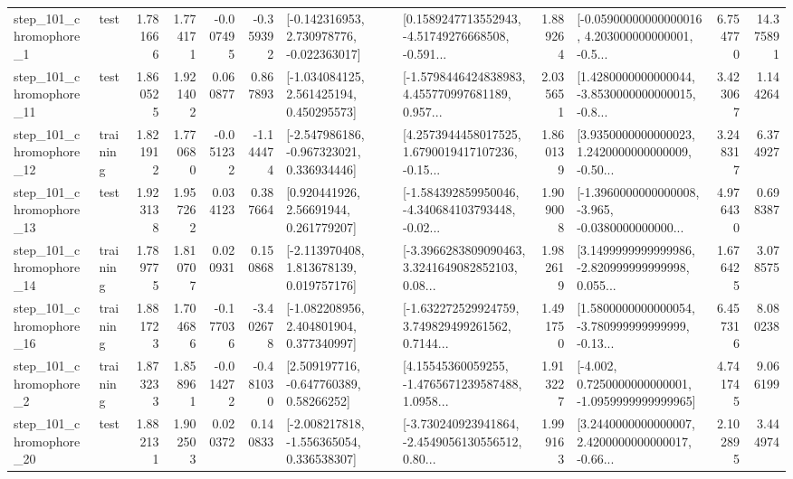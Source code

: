 \begin{tabular}{llrrrrllrlrr}
   step\_101\_chromophore\_1 &      test &      1.781666 &    1.774171 &     -0.007495 & -0.359392 &   [-0.142316953, 2.730978776, -0.022363017] &  [0.1589247713552943, -4.51749276668508, -0.591... &       1.889264 &  [-0.05900000000000016, 4.203000000000001, -0.5... &            6.754770 &         14.375891 \\
  step\_101\_chromophore\_11 &      test &      1.860525 &    1.921402 &      0.060877 &  0.867893 &    [-1.034084125, 2.561425194, 0.450295573] &  [-1.5798446424838983, 4.455770997681189, 0.957... &       2.035651 &  [1.4280000000000044, -3.8530000000000015, -0.8... &            3.423067 &          1.144264 \\
  step\_101\_chromophore\_12 &  training &      1.821912 &    1.770680 &     -0.051232 & -1.144474 &   [-2.547986186, -0.967323021, 0.336934446] &  [4.2573944458017525, 1.6790019417107236, -0.15... &       1.860139 &  [3.9350000000000023, 1.2420000000000009, -0.50... &            3.248317 &          6.374927 \\
  step\_101\_chromophore\_13 &      test &      1.923138 &    1.957262 &      0.034123 &  0.387664 &      [0.920441926, 2.56691944, 0.261779207] &  [-1.584392859950046, -4.340684103793448, -0.02... &       1.909008 &  [-1.3960000000000008, -3.965, -0.0380000000000... &            4.976430 &          0.698387 \\
  step\_101\_chromophore\_14 &  training &      1.789775 &    1.810707 &      0.020931 &  0.150868 &    [-2.113970408, 1.813678139, 0.019757176] &  [-3.3966283809090463, 3.3241649082852103, 0.08... &       1.982619 &  [3.1499999999999986, -2.820999999999998, 0.055... &            1.676425 &          3.078575 \\
  step\_101\_chromophore\_16 &  training &      1.881723 &    1.704686 &     -0.177036 & -3.402678 &    [-1.082208956, 2.404801904, 0.377340997] &  [-1.632272529924759, 3.749829499261562, 0.7144... &       1.491750 &  [1.5800000000000054, -3.780999999999999, -0.13... &            6.457316 &          8.080238 \\
   step\_101\_chromophore\_2 &  training &      1.873233 &    1.858961 &     -0.014272 & -0.481030 &     [2.509197716, -0.647760389, 0.58266252] &  [4.15545360059255, -1.4765671239587488, 1.0958... &       1.913227 &  [-4.002, 0.7250000000000001, -1.0959999999999965] &            4.741745 &          9.066199 \\
  step\_101\_chromophore\_20 &      test &      1.882131 &    1.902503 &      0.020372 &  0.140833 &   [-2.008217818, -1.556365054, 0.336538307] &  [-3.730240923941864, -2.4549056130556512, 0.80... &       1.999163 &  [3.2440000000000007, 2.4200000000000017, -0.66... &            2.102895 &          3.444974 \\

\end{tabular}

